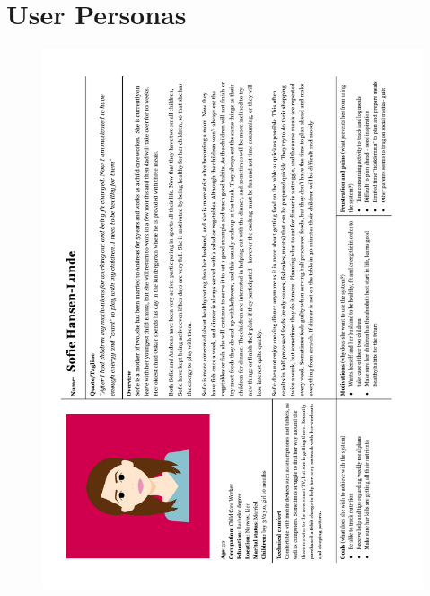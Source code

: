 \section{User Personas}
    \label{Userpersona}
     \begin{figure}
        \centering
        \includegraphics[scale=0.65]{figures/personafem.pdf}
    \end{figure}
